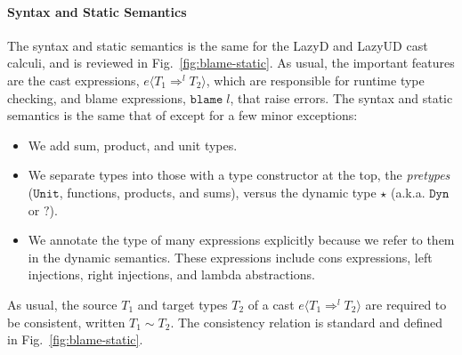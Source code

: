 \documentclass[acmsmall,review,anonymous]{acmart}\settopmatter{printfolios=true,printccs=false,printacmref=false}
\newcommand{\figref}[1]{Fig.~\ref{#1}}
\newcommand{\lazyUD}{Lazy\;UD}
\newcommand{\lazyD}{Lazy\;D}
\newcommand{\POOunit}[0]{\mathtt{Unit}}
\newcommand{\eOOcast}[4]{#1 \langle \cOOcast{#2}{#3}{#4} \rangle}
\newcommand{\eOOblame}[1]{\mathtt{blame} \; #1}
\newcommand{\cOOcast}[3]{#1 \Rightarrow^{#2} #3}
\begin{document}
\paragraph{Syntax and Static Semantics}

The syntax and static semantics is the same for the \lazyD{} and
\lazyUD{} cast calculi, and is reviewed in \figref{fig:blame-static}.
As usual, the important features are the cast expressions,
$\eOOcast{e}{T_1}{l}{T_2}$, which are responsible for runtime type
checking, and blame expressions, $\eOOblame{l}$, that raise errors.
The syntax and static semantics is the same that of
\citet{siek2009exploring} except for a few minor exceptions:
\begin{itemize}
\item We add sum, product, and unit types.
\item We separate types into those with a type constructor at the top,
  the \emph{pretypes} ($\POOunit$, functions, products, and sums),
  versus the dynamic type $\star$ (a.k.a. $\mathtt{Dyn}$ or
  $\mathbb{?}$).
\item We annotate the type of many expressions explicitly because we 
refer to them in the dynamic semantics. These expressions include cons 
expressions, left injections, right injections, and lambda abstractions.
\end{itemize}
As usual, the source $T_1$ and target types $T_2$ of a cast
$\eOOcast{e}{T_1}{l}{T_2}$ are required to be consistent, written $T_1
\sim T_2$. The consistency relation is standard and defined in
\figref{fig:blame-static}.



\end{document}
